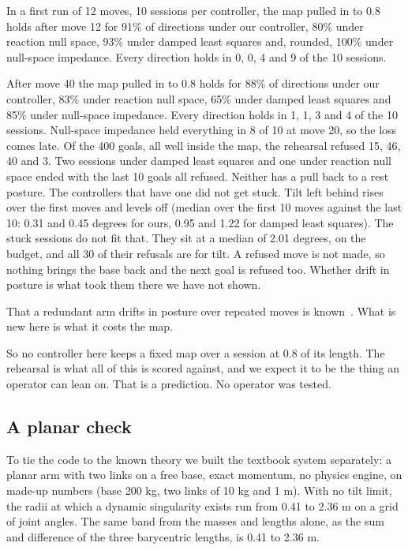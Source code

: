 \documentclass[pdflatex,sn-mathphys-num]{sn-jnl}
\begin{document}
In a first run of 12 moves, 10 sessions per controller, the map pulled in to 0.8 holds after move 12 for 91\% of
directions under our controller, 80\% under reaction null space, 93\% under damped least squares and, rounded, 100\%
under null-space impedance. Every direction holds in 0, 0, 4 and 9 of the 10 sessions.

After move 40 the map pulled in to 0.8 holds for 88\% of directions under our controller, 83\% under reaction null
space, 65\% under damped least squares and 85\% under null-space impedance. Every direction holds in 1, 1, 3 and 4
of the 10 sessions. Null-space impedance held everything in 8 of 10 at move 20, so the loss comes late. Of the 400
goals, all well inside the map, the rehearsal refused 15, 46, 40 and 3. Two sessions under damped least squares
and one under reaction null space ended with the last 10 goals all refused. Neither has a pull back to a rest posture. The controllers that have one did not get stuck. Tilt left behind rises
over the first moves and levels off (median over the first 10 moves against the last 10: 0.31 and 0.45 degrees for
ours, 0.95 and 1.22 for damped least squares). The stuck sessions do not fit that. They sit at a median of 2.01
degrees, on the budget, and all 30 of their refusals are for tilt. A refused move is not made, so nothing brings the
base back and the next goal is refused too. Whether drift in posture is what took them there we have not shown.

That a redundant arm drifts in posture over repeated moves is known~\cite{chen2013}. What is new here is what
it costs the map.

So no controller here keeps a fixed map over a session at 0.8 of its length. The rehearsal is what all of this is
scored against, and we expect it to be the thing an operator can lean on. That is a prediction. No operator was
tested.

\subsection{A planar check}\label{sec:planar}
To tie the code to the known theory we built the textbook system separately: a planar arm with two links on a
free base, exact momentum, no physics engine, on made-up numbers (base 200 kg, two links of 10 kg and 1 m).
With no tilt limit, the radii at which a dynamic singularity exists
run from 0.41 to 2.36 m on a grid of joint angles. The same band from the masses and lengths alone, as the sum
and difference of the three barycentric lengths, is 0.41 to 2.36 m. %
\end{document}
